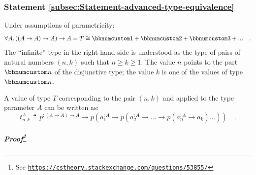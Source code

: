 \subsubsection{Statement \label{subsec:Statement-advanced-type-equivalence}\ref{subsec:Statement-advanced-type-equivalence}}

Under assumptions of parametricity:
\[
\forall A.\,((A\rightarrow A)\rightarrow A)\rightarrow A=T\cong\bbnum 1+\bbnum 2+\bbnum 3+...\quad.
\]
The \textsf{``}infinite\textsf{''} type in the right-hand side is understood as the
type of pairs of natural numbers $\left(n,k\right)$ such that $n\ge k\ge1$.
The value $n$ points to the part $\bbnum n$ of the disjunctive type;
the value $k$ is one of the values of type $\bbnum n$.

A value of type $T$ corresponding to the pair $\left(n,k\right)$
and applied to the type parameter $A$ can be written as:
\[
t_{n,k}^{A}\triangleq p^{:(A\rightarrow A)\rightarrow A}\rightarrow p(a_{1}^{:A}\rightarrow p(a_{2}^{:A}\rightarrow...\rightarrow p(a_{n}^{:A}\rightarrow a_{k})...))\quad.
\]


\subparagraph{Proof\protect\footnote{See \texttt{\protect\href{https://cstheory.stackexchange.com/questions/53855/}{https://cstheory.stackexchange.com/questions/53855/}}}}

